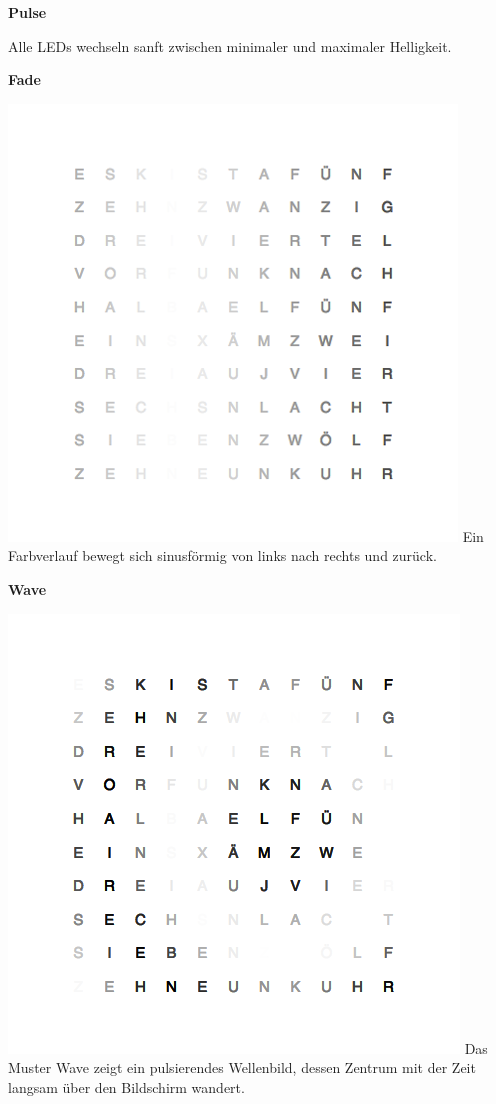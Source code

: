 \begin{multicols}{2}
\textbf{Pulse}

Alle LEDs wechseln sanft zwischen minimaler und maximaler Helligkeit.

\textbf{Fade}

{
    \centering
    \includegraphics[width=\columnwidth]{Abbildungen/Software/Demo/Fade}
}
Ein Farbverlauf bewegt sich sinusförmig von links nach rechts und zurück.

\textbf{Wave}

{
    \centering
    \includegraphics[width=\columnwidth]{Abbildungen/Software/Demo/Welle}
}
Das Muster Wave zeigt ein pulsierendes Wellenbild, dessen Zentrum mit der Zeit langsam über den Bildschirm wandert.


\end{multicols}
